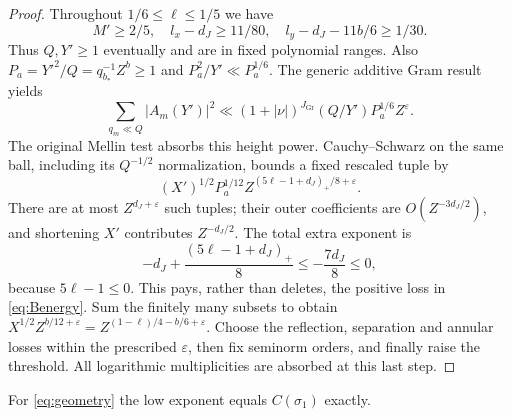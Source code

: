 \documentclass[11pt,a4paper]{article}
\theoremstyle{definition}
\newcommand{\eps}{\varepsilon}
\newcommand{\sig}{\sigma_1}
\newcommand{\pos}[1]{\left(#1\right)_+}
\begin{document}
\begin{proof}
Throughout $1/6\le\ell\le1/5$ we have
\[
 M'\ge2/5,\quad l_x-d_J\ge11/80,\quad
 l_y-d_J-11b/6\ge1/30.
\]
Thus $Q,Y'\ge1$ eventually and are in fixed polynomial ranges.
Also $P_a=Y'^2/Q=q_{b_*}^{-1}Z^b\ge1$ and
$P_a^2/Y'\ll P_a^{1/6}$. The generic additive Gram result yields
\[
 \sum_{q_m\ll Q}|A_m(Y')|^2
 \ll (1+|\nu|)^{J_{\mathrm{Gr}}}(Q/Y')P_a^{1/6}Z^\eps.
\]
The original Mellin test absorbs this height power.
Cauchy--Schwarz on the same ball, including its $Q^{-1/2}$
normalization, bounds a fixed rescaled tuple by
\[
 (X')^{1/2}P_a^{1/12}
 Z^{\pos{5\ell-1+d_J}/8+\eps}.
\]
There are at most $Z^{d_J+\eps}$ such tuples; their outer coefficients
are $O(Z^{-3d_J/2})$, and shortening $X'$ contributes $Z^{-d_J/2}$.
The total extra exponent is
\[
 -d_J+\frac{\pos{5\ell-1+d_J}}8\le-\frac{7d_J}{8}\le0,
\]
because $5\ell-1\le0$. This pays, rather than deletes, the positive
loss in \eqref{eq:Benergy}. Sum the finitely many subsets to obtain
$X^{1/2}Z^{b/12+\eps}=Z^{(1-\ell)/4-b/6+\eps}$.
Choose the reflection, separation and annular losses within the
prescribed $\eps$, then fix seminorm orders, and finally raise the
threshold. All logarithmic multiplicities are absorbed at this last step.
\end{proof}
For \eqref{eq:geometry} the low exponent equals $C(\sig)$ exactly.
\end{document}
